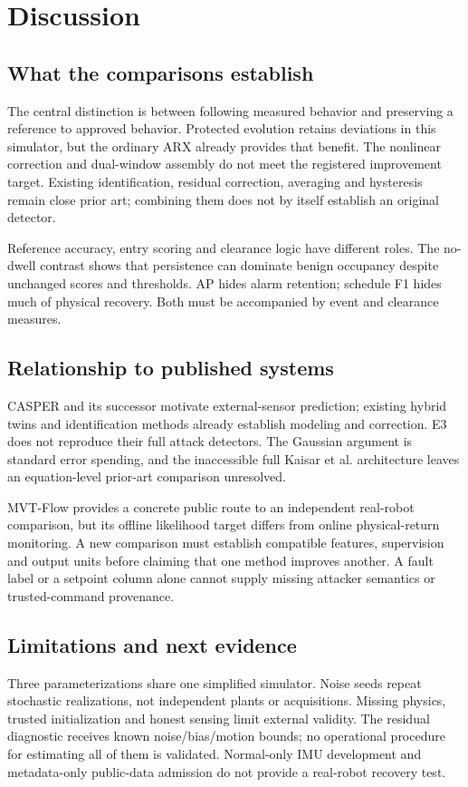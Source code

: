 \section{Discussion}\label{sec:discussion}
\subsection{What the comparisons establish}
The central distinction is between following measured behavior and preserving a reference to approved behavior. Protected evolution retains deviations in this simulator, but the ordinary ARX already provides that benefit. The nonlinear correction and dual-window assembly do not meet the registered improvement target. Existing identification, residual correction, averaging and hysteresis remain close prior art; combining them does not by itself establish an original detector.

Reference accuracy, entry scoring and clearance logic have different roles. The no-dwell contrast shows that persistence can dominate benign occupancy despite unchanged scores and thresholds. AP hides alarm retention; schedule F1 hides much of physical recovery. Both must be accompanied by event and clearance measures.

\subsection{Relationship to published systems}
CASPER and its successor motivate external-sensor prediction; existing hybrid twins and identification methods already establish modeling and correction. E3 does not reproduce their full attack detectors. The Gaussian argument is standard error spending, and the inaccessible full Kaisar et al. architecture leaves an equation-level prior-art comparison unresolved.

MVT-Flow provides a concrete public route to an independent real-robot comparison, but its offline likelihood target differs from online physical-return monitoring. A new comparison must establish compatible features, supervision and output units before claiming that one method improves another. A fault label or a setpoint column alone cannot supply missing attacker semantics or trusted-command provenance.

\subsection{Limitations and next evidence}
Three parameterizations share one simplified simulator. Noise seeds repeat stochastic realizations, not independent plants or acquisitions. Missing physics, trusted initialization and honest sensing limit external validity. The residual diagnostic receives known noise/bias/motion bounds; no operational procedure for estimating all of them is validated. Normal-only IMU development and metadata-only public-data admission do not provide a real-robot recovery test.

